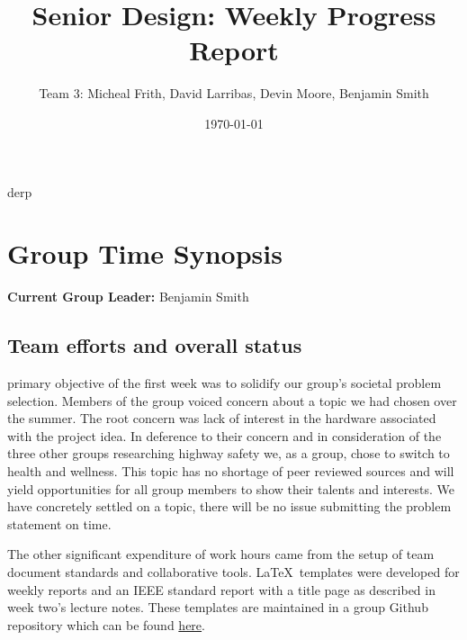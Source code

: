 \documentclass[12pt,article,compsoc]{IEEEtran}
\begin{document}
\title{Senior Design: Weekly Progress Report}
\author{Team 3: Micheal Frith, David Larribas, Devin Moore, Benjamin Smith}
\date{\today}
\maketitle

%
{derp}

\section{Group Time Synopsis}
	{\bf Current Group Leader:} Benjamin Smith
	
	\subsection{Team efforts and overall status}
	 primary objective of the first week was to solidify our group’s societal
	problem selection. Members of the group voiced concern about a topic we had chosen over the summer. 
	The root concern was lack of interest in the hardware associated with the project idea. In 
	deference to their concern and in consideration of the three other groups researching highway 
	safety we, as a group, chose to switch to health and wellness. This topic has no shortage of peer
	reviewed sources and will yield opportunities for all group members to show their talents and 
	interests. We have concretely settled on a topic, there will be no issue submitting the problem 
	statement on time. 

	The other significant expenditure of work hours came from the setup of team document standards and 
	collaborative tools. \LaTeX\ templates were developed for weekly reports and an IEEE standard report
	with a title page as described in week two’s lecture notes. These templates are maintained in a 
	group Github repository which can be found \href{http://github.com/2014SeniorProject}{here}.
\end{document}
